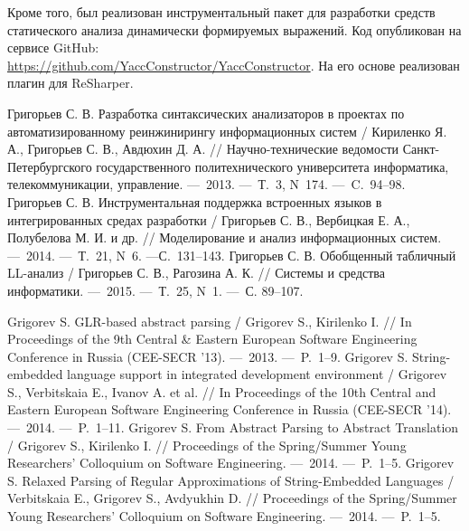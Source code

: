 Кроме того, был реализован инструментальный пакет для разработки средств статического анализа динамически формируемых выражений. Код опубликован на сервисе GitHub: \\ \url{https://github.com/YaccConstructor/YaccConstructor}. На его основе реализован плагин для ReSharper. 

\newpage
\renewcommand{\refname}{\Large Публикации автора по теме диссертации}

\begin{thebibliography}{99}

 Григорьев С. В. Разработка синтаксических анализаторов в проектах по автоматизированному реинжинирингу информационных систем / Кириленко Я. А., Григорьев С. В., Авдюхин Д. А. // Научно-технические ведомости Санкт-Петербургского государственного политехнического университета информатика, телекоммуникации, управление. ---~2013. ---~Т.~3, N~174. ---~C.~94--98.
 Григорьев С. В. Инструментальная поддержка встроенных языков в интегрированных средах разработки / Григорьев С. В., Вербицкая Е. А., Полубелова М. И. и др. // Моделирование и анализ информационных систем. ---~2014. ---~Т.~21, N~6.  ---С.~131--143.
 Григорьев С. В. Обобщенный табличный LL-анализ / Григорьев С. В., Рагозина А. К. // Системы и средства информатики. ---~2015. ---~Т.~25, N~1.  ---~С. 89--107. 

 Grigorev S. GLR-based abstract parsing / Grigorev S., Kirilenko I. // In Proceedings of the 9th Central \& Eastern European Software Engineering Conference in Russia (CEE-SECR ’13). ---~2013. ---~P.~1--9.
 Grigorev S. String-embedded language support in integrated development environment / Grigorev S., Verbitskaia E., Ivanov A. et al. // In Proceedings of the 10th Central and Eastern European Software Engineering Conference in Russia (CEE-SECR '14). ---~2014. ---~P.~1--11.
 Grigorev S. From Abstract Parsing to Abstract Translation / Grigorev S., Kirilenko I. // Proceedings of the Spring/Summer Young Researchers' Colloquium on Software Engineering. ---~2014. ---~P.~1--5.
 Grigorev S.  Relaxed Parsing of Regular Approximations of String-Embedded Languages / Verbitskaia E., Grigorev S., Avdyukhin D. // Proceedings of the Spring/Summer Young Researchers' Colloquium on Software Engineering. ---~2014. ---~P.~1--5.

\end{thebibliography}
